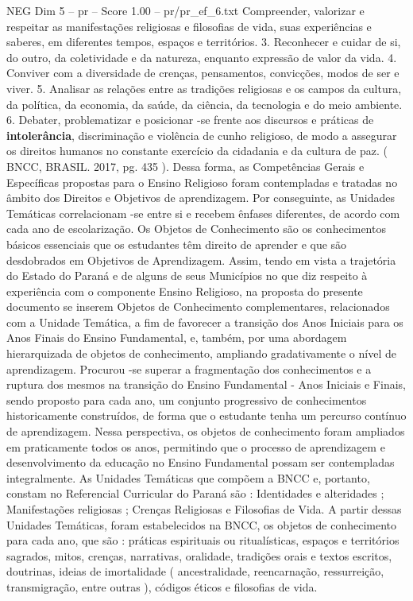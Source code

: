 \begin{textsample}{NEG Dim 5 – pr – Score 1.00 – pr/pr\_ef\_6.txt}
Compreender, valorizar e respeitar as manifestações religiosas e filosofias de vida, suas experiências e saberes, em diferentes tempos, espaços e territórios. 3.
Reconhecer e cuidar de si, do outro, da coletividade e da natureza, enquanto expressão de valor da vida. 4.
Conviver com a diversidade de crenças, pensamentos, convicções, modos de ser e viver. 5.
Analisar as relações entre as tradições religiosas e os campos da cultura, da política, da economia, da saúde, da ciência, da tecnologia e do meio ambiente. 6.
Debater, problematizar e posicionar -se frente aos discursos e práticas de \textbf{intolerância}, discriminação e violência de cunho religioso, de modo a assegurar os direitos humanos no constante exercício da cidadania e da cultura de paz. ( BNCC, BRASIL. 2017, pg. 435 ).
Dessa forma, as Competências Gerais e Específicas propostas para o Ensino Religioso foram contempladas e tratadas no âmbito dos Direitos e Objetivos de aprendizagem.
Por conseguinte, as Unidades Temáticas correlacionam -se entre si e recebem ênfases diferentes, de acordo com cada ano de escolarização.
Os Objetos de Conhecimento são os conhecimentos básicos essenciais que os estudantes têm direito de aprender e que são desdobrados em Objetivos de Aprendizagem.
Assim, tendo em vista a trajetória do Estado do Paraná e de alguns de seus Municípios no que diz respeito à experiência com o componente Ensino Religioso, na proposta do presente documento se inserem Objetos de Conhecimento complementares, relacionados com a Unidade Temática, a fim de favorecer a transição dos Anos Iniciais para os Anos Finais do Ensino Fundamental, e, também, por uma abordagem hierarquizada de objetos de conhecimento, ampliando gradativamente o nível de aprendizagem.
Procurou -se superar a fragmentação dos conhecimentos e a ruptura dos mesmos na transição do Ensino Fundamental - Anos Iniciais e Finais, sendo proposto para cada ano, um conjunto progressivo de conhecimentos historicamente construídos, de forma que o estudante tenha um percurso contínuo de aprendizagem.
Nessa perspectiva, os objetos de conhecimento foram ampliados em praticamente todos os anos, permitindo que o processo de aprendizagem e desenvolvimento da educação no Ensino Fundamental possam ser contempladas integralmente.
As Unidades Temáticas que compõem a BNCC e, portanto, constam no Referencial Curricular do Paraná são : Identidades e alteridades ; Manifestações religiosas ; Crenças Religiosas e Filosofias de Vida.
A partir dessas Unidades Temáticas, foram estabelecidos na BNCC, os objetos de conhecimento para cada ano, que são : práticas espirituais ou ritualísticas, espaços e territórios sagrados, mitos, crenças, narrativas, oralidade, tradições orais e textos escritos, doutrinas, ideias de imortalidade ( ancestralidade, reencarnação, ressurreição, transmigração, entre outras ), códigos éticos e filosofias de vida.

\end{textsample}
